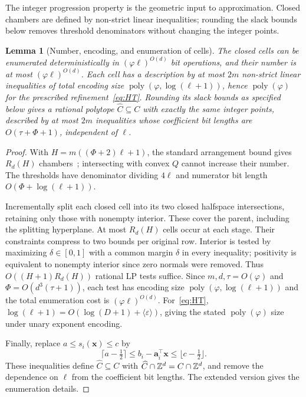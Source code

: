 \documentclass[final,5p,times,twocolumn]{elsarticle}
\newtheorem{lemma}[theorem]{Lemma}
\theoremstyle{definition}\newtheorem{definition}{Definition}[section]
\theoremstyle{remark}\newtheorem{remark}[theorem]{Remark}
\newcommand{\eps}{\varepsilon}
\newcommand{\poly}{\operatorname{poly}}
\begin{document}
The integer progression property is the geometric input to approximation. Closed chambers are defined by non-strict linear inequalities; rounding the slack bounds below removes threshold denominators without changing the integer points.

\begin{lemma}[Number, encoding, and enumeration of cells]\label{lem:arrangement}
The closed cells can be enumerated deterministically in $(\varphi\ell)^{O(d)}$ bit operations, and their number is at most $(\varphi\ell)^{O(d)}$. Each cell has a description by at most $2m$ non-strict linear inequalities of total encoding size $\poly(\varphi,\log(\ell+1))$, hence $\poly(\varphi)$ for the prescribed refinement~\eqref{eq:HT}. Rounding its slack bounds as specified below gives a rational polytope $\widehat C\subseteq C$ with exactly the same integer points, described by at most $2m$ inequalities whose coefficient bit lengths are $O(\tau+\Phi+1)$, independent of $\ell$.
\end{lemma}
\begin{proof}
With $H=m((\Phi+2)\ell+1)$, the standard arrangement bound gives $R_d(H)$ chambers~\cite{Stanley}; intersecting with convex $Q$ cannot increase their number. The thresholds have denominator dividing $4\ell$ and numerator bit length $O(\Phi+\log(\ell+1))$.

Incrementally split each closed cell into its two closed halfspace intersections, retaining only those with nonempty interior. These cover the parent, including the splitting hyperplane. At most $R_d(H)$ cells occur at each stage. Their constraints compress to two bounds per original row. Interior is tested by maximizing $\delta\in[0,1]$ with a common margin $\delta$ in every inequality; positivity is equivalent to nonempty interior since zero normals were removed. Thus $O((H+1)R_d(H))$ rational LP tests suffice. Since $m,d,\tau=O(\varphi)$ and $\Phi=O(d^3(\tau+1))$, each test has encoding size $\poly(\varphi,\log(\ell+1))$ and the total enumeration cost is $(\varphi\ell)^{O(d)}$. For~\eqref{eq:HT}, $\log(\ell+1)=O(\log(D+1)+\langle\eps\rangle)$, giving the stated $\poly(\varphi)$ size under unary exponent encoding.

Finally, replace $a\le s_i(\mathbf{x})\le c$ by
\[
 \lceil a-\tfrac12\rceil\le b_i-\mathbf a_i^\top\mathbf{x}
 \le\lfloor c-\tfrac12\rfloor.
\]
These inequalities define $\widehat C\subseteq C$ with $\widehat C\cap\mathbb Z^d=C\cap\mathbb Z^d$, and remove the dependence on $\ell$ from the coefficient bit lengths. The extended version gives the enumeration details.
\end{proof}
\end{document}
